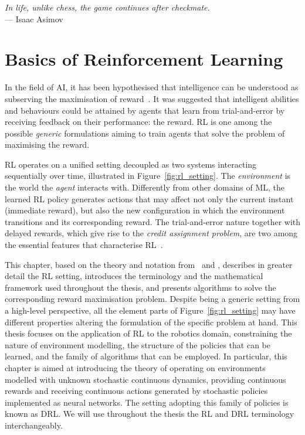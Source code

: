
\begin{flushright}
    \textsl{In life, unlike chess, the game continues after checkmate.}\\
    --- Isaac Asimov
\end{flushright}

\chapter{Basics of Reinforcement Learning}
\label{ch:reinforcement_learning}

In the field of \ac{AI}, it has been hypothesised that intelligence can be understood as subserving the maximisation of reward~\parencite{silver_reward_2021}.
It was suggested that intelligent abilities and behaviours could be attained by agents that learn from trial-and-error by receiving feedback on their performance: the reward.
\ac{RL} is one among the possible \emph{generic} formulations aiming to train agents that solve the problem of maximising the reward.

\acl{RL} operates on a unified setting decoupled as two systems interacting sequentially over time, illustrated in Figure~\ref{fig:rl_setting}.
The \emph{environment} is the world the \emph{agent} interacts with.
Differently from other domains of \ac{ML}, the learned \ac{RL} policy generates actions that may affect not only the current instant (immediate reward), but also the new configuration in which the environment transitions and its corresponding reward.
The trial-and-error nature together with delayed rewards, which give rise to the \emph{credit assignment problem}, are two among the essential features that characterise \acs{RL}~\parencite{sutton_reinforcement_2018}.

This chapter, based on the theory and notation from~\textcite{achiam_spinning_2018} and \textcite{dong_deep_2020}, describes in greater detail the \acl{RL} setting, introduces the terminology and the mathematical framework used throughout the thesis, and presents algorithms to solve the corresponding reward maximisation problem.
Despite being a generic setting from a high-level perspective, all the element parts of Figure~\ref{fig:rl_setting} may have different properties altering the formulation of the specific problem at hand.
This thesis focuses on the application of \ac{RL} to the robotics domain, constraining the nature of environment modelling, the structure of the policies that can be learned, and the family of algorithms that can be employed.
In particular, this chapter is aimed at introducing the theory of operating on environments modelled with unknown stochastic continuous dynamics, providing continuous rewards and receiving continuous actions generated by stochastic policies implemented as neural networks.
The setting adopting this family of policies is known as \ac{DRL}.
We will use throughout the thesis the \ac{RL} and \ac{DRL} terminology interchangeably.

